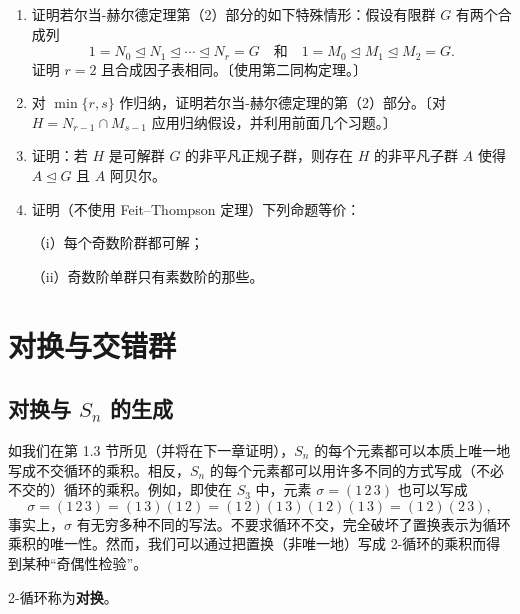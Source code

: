\begin{enumerate}
〔对（iv），先证明 \(G\) 的极小非平凡正规子群 \(M\) 必阿贝尔，然后用归纳法。为看出 \(M\) 阿贝尔，取 \(N \trianglelefteq M\) 具有素数指数（由（iii）），并证明对所有 \(y \in M\) 有 \(x^{-1}y^{-1}xy \in N\)（参见第 1 章习题 40）。把同样的论证用于 \(gNg^{-1}\)，证明 \(x^{-1}y^{-1}xy\) 属于 \(N\) 的所有 \(G\)-共轭的交，并利用 \(M\) 的极小性推出 \(x^{-1}y^{-1}xy = 1\).〕

\item 证明若尔当-赫尔德定理第（2）部分的如下特殊情形：假设有限群 \(G\) 有两个合成列
\[
1 = N_0 \trianglelefteq N_1 \trianglelefteq \cdots \trianglelefteq N_r = G \quad \text{和} \quad 1 = M_0 \trianglelefteq M_1 \trianglelefteq M_2 = G.
\]
证明 \(r = 2\) 且合成因子表相同。〔使用第二同构定理。〕

\item 对 \(\min\{r, s\}\) 作归纳，证明若尔当-赫尔德定理的第（2）部分。〔对 \(H = N_{r-1} \cap M_{s-1}\) 应用归纳假设，并利用前面几个习题。〕

\item 证明：若 \(H\) 是可解群 \(G\) 的非平凡正规子群，则存在 \(H\) 的非平凡子群 \(A\) 使得 \(A \trianglelefteq G\) 且 \(A\) 阿贝尔。

\item 证明（不使用 Feit--Thompson 定理）下列命题等价：

（i）每个奇数阶群都可解；

（ii）奇数阶单群只有素数阶的那些。
\end{enumerate}

\section{对换与交错群}

\subsection*{对换与 \(S_n\) 的生成}

如我们在第 1.3 节所见（并将在下一章证明），\(S_n\) 的每个元素都可以本质上唯一地写成不交循环的乘积。相反，\(S_n\) 的每个元素都可以用许多不同的方式写成（不必不交的）循环的乘积。例如，即使在 \(S_3\) 中，元素 \(\sigma = (1\,2\,3)\) 也可以写成
\[
\sigma = (1\,2\,3) = (1\,3)(1\,2) = (1\,2)(1\,3)(1\,2)(1\,3) = (1\,2)(2\,3),
\]
事实上，\(\sigma\) 有无穷多种不同的写法。不要求循环不交，完全破坏了置换表示为循环乘积的唯一性。然而，我们可以通过把置换（非唯一地）写成 2-循环的乘积而得到某种“奇偶性检验”。

\begin{definition}
2-循环称为\textbf{对换}。
\end{definition}


